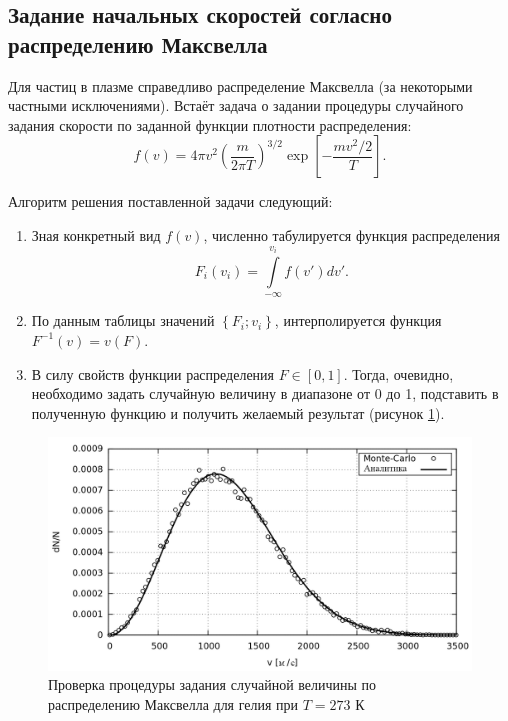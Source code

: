 \subsection{Задание начальных скоростей согласно распределению Максвелла}
\label{sec:HowToMaxwell}

Для частиц в плазме справедливо распределение Максвелла (за некоторыми частными исключениями). Встаёт задача о задании процедуры случайного задания скорости по заданной функции плотности распределения:
\begin{equation}
f(v) = 4 \pi v^2 \left( \frac{m}{2 \pi T} \right)^{3/2} \exp \left[ - \frac{m v^2/2}{T} \right].
\label{eq:maxwell_dist}
\end{equation}

Алгоритм решения поставленной задачи следующий:
\begin{enumerate}
\item Зная конкретный вид $f(v)$, численно табулируется функция распределения
\begin{equation}
F_i (v_i) = \int\limits_{- \infty}^{v_i} f(v') dv'.
\end{equation}
\item По данным таблицы значений $\left\{ F_i ; v_i  \right\}$, интерполируется функция  $F^{-1}(v) = v(F)$.
\item В силу свойств функции распределения $F \in \left[0,1\right]$. Тогда, очевидно, необходимо задать случайную величину в диапазоне от 0 до 1, подставить в полученную функцию и получить желаемый результат (рисунок \ref{fig:He(T=273)}).
\end{enumerate}

\begin{figure}[h!]
\centering
\includegraphics[width=0.85\linewidth]{./fig/ch4/He(T=273)}
\caption{Проверка процедуры задания случайной величины по распределению Максвелла для гелия при $T = 273 \text{ К}$}
\label{fig:He(T=273)}
\end{figure}


